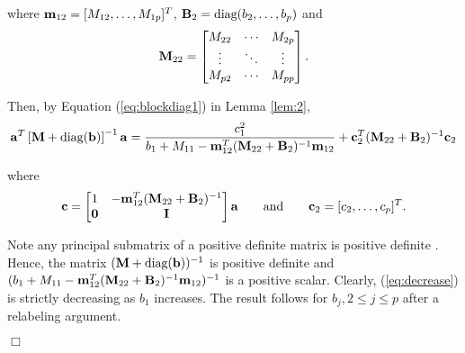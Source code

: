 \documentclass[11pt]{article}
\newtheorem{Main Result}{Main Result}
\def\vectorfontone{\bf}
\def\va{{\vectorfontone a}}                      %
\def\vb{{\vectorfontone b}}                      %
\def\vc{{\vectorfontone c}}                      %
\def\vm{{\vectorfontone m}}                      %
\def\vzero{{\vectorfontone 0}}
\def\matrixfontone{\bf}
\def\mB{{\matrixfontone B}}                      %
\def\mI{{\matrixfontone I}}                      %
\def\mM{{\matrixfontone M}}                      %
\def\diag{\text{diag}}
\begin{document}
\noindent where $\vm_{12}=[M_{12},\dots,M_{1p}]^T$,
$\mB_2 = \diag(b_2,\ldots,b_p)$ and
$$
\mM_{22}=
\begin{bmatrix}
M_{22} & \cdots & M_{2p} \\
\vdots & \ddots & \vdots \\
M_{p2} & \cdots & M_{pp}
\end{bmatrix}.
$$

\noindent Then, by Equation (\ref{eq:blockdiag1}) in Lemma \ref{lem:2},
\begin{equation}\label{eq:decrease}
\va^T\left[\mM + \diag(\vb)\right]^{-1}\va
= \frac{c_1^2}{b_1 + M_{11} - \vm^T_{12}(\mM_{22} + \mB_2)^{-1}\vm_{12}}
+ \vc_2^T(\mM_{22} + \mB_2)^{-1}\vc_2
\end{equation}

\noindent where
$$
\vc =
\begin{bmatrix}
1      & -\vm^T_{12}(\mM_{22} + \mB_2)^{-1} \\
\vzero &  \mI
\end{bmatrix}
\va
\qquad
\mbox{and}
\qquad
\vc_2 = [c_2,\dots,c_p]^T.
$$

\noindent Note any principal submatrix of a positive definite matrix is positive definite \citep[Chapter 7.1.2]{Horn2012}. Hence, the matrix $(\mM + \diag(\vb))^{-1}$ is positive definite and
$(b_1 + M_{11} - \vm^T_{12}(\mM_{22} + \mB_2)^{-1}\vm_{12})^{-1}$ is a positive scalar. Clearly, (\ref{eq:decrease}) is strictly decreasing as $b_1$ increases. The
result follows for $b_j, 2\leq j\leq p$ after a relabeling argument.
\vspace{-0.5cm}\begin{flushright}$\Box$\end{flushright}
\end{document}
